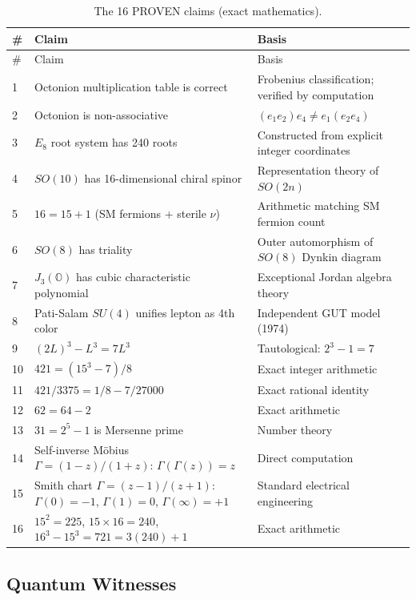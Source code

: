 \documentclass[11pt]{article}
\begin{document}
\begin{longtable}{p{0.5cm} p{6cm} p{7cm}}
\caption{The 16 PROVEN claims (exact mathematics).} \label{tab:proven} \\
\toprule
\# & Claim & Basis \\
\midrule
\endfirsthead
\toprule
\# & Claim & Basis \\
\midrule
\endhead
1 & Octonion multiplication table is correct & Frobenius classification; verified by computation \\
2 & Octonion is non-associative & $(e_1 e_2) e_4 \neq e_1 (e_2 e_4)$ \\
3 & $E_8$ root system has 240 roots & Constructed from explicit integer coordinates \\
4 & $SO(10)$ has 16-dimensional chiral spinor & Representation theory of $SO(2n)$ \\
5 & $16 = 15 + 1$ (SM fermions + sterile $\nu$) & Arithmetic matching SM fermion count \\
6 & $SO(8)$ has triality & Outer automorphism of $SO(8)$ Dynkin diagram \\
7 & $J_3(\mathbb{O})$ has cubic characteristic polynomial & Exceptional Jordan algebra theory \\
8 & Pati-Salam $SU(4)$ unifies lepton as 4th color & Independent GUT model (1974) \\
9 & $(2L)^3 - L^3 = 7L^3$ & Tautological: $2^3 - 1 = 7$ \\
10 & $421 = (15^3 - 7)/8$ & Exact integer arithmetic \\
11 & $421/3375 = 1/8 - 7/27000$ & Exact rational identity \\
12 & $62 = 64 - 2$ & Exact arithmetic \\
13 & $31 = 2^5 - 1$ is Mersenne prime & Number theory \\
14 & Self-inverse M\"obius $\Gamma = (1-z)/(1+z)$: $\Gamma(\Gamma(z)) = z$ & Direct computation \\
15 & Smith chart $\Gamma = (z-1)/(z+1)$: $\Gamma(0) = -1$, $\Gamma(1) = 0$, $\Gamma(\infty) = +1$ & Standard electrical engineering \\
16 & $15^2 = 225$, $15 \times 16 = 240$, $16^3 - 15^3 = 721 = 3(240)+1$ & Exact arithmetic \\
\bottomrule
\end{longtable}

\subsection{Quantum Witnesses}
\end{document}

